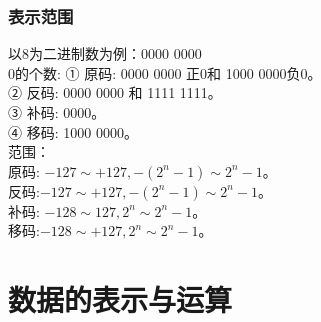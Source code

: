 \documentclass[lang=cn,10pt]{elegantbook}
\begin{document}
\subsection{表示范围}
以8为二进制数为例：0000 0000\\
0的个数:  ① 原码: 0000 0000 正0和 1000 0000负0。\\
② 反码: 0000 0000 和 1111 1111。\\
③ 补码: 0000。\\
④ 移码: 1000 0000。\\
范围：\\
	原码: $-127\sim+127,-(2^n-1) \sim 2^n-1$。\\
	反码:$-127\sim+127,-(2^n-1)\sim2^n-1$。\\
补码: $-128\sim127,2^n\sim2^n-1$。\\
移码:$-128\sim+127,2^n\sim2^n-1$。


\chapter{数据的表示与运算}
\end{document}
